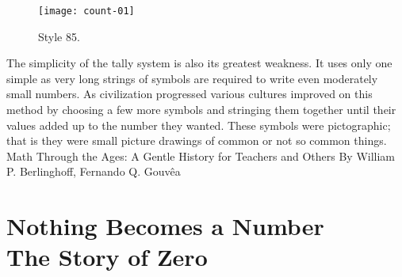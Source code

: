 \begin{figure}[ht]
\centering
\texttt{[image: count-01]}
\caption*{Style 85.}
\end{figure}

The simplicity of the tally system is also its greatest weakness. It uses only one simple as very long strings of symbols are required to write even moderately small numbers. As civilization progressed various cultures improved on this
method by choosing a few more symbols and stringing them together until their values added up to the number they wanted. These symbols were pictographic; that is they were small picture drawings of common or not so common things. 
Math Through the Ages: A Gentle History for Teachers and Others
 By William P. Berlinghoff, Fernando Q. Gouvêa

\lipsum[1-3] 


\chapter{Nothing Becomes a Number\\ The Story of Zero\\ }



